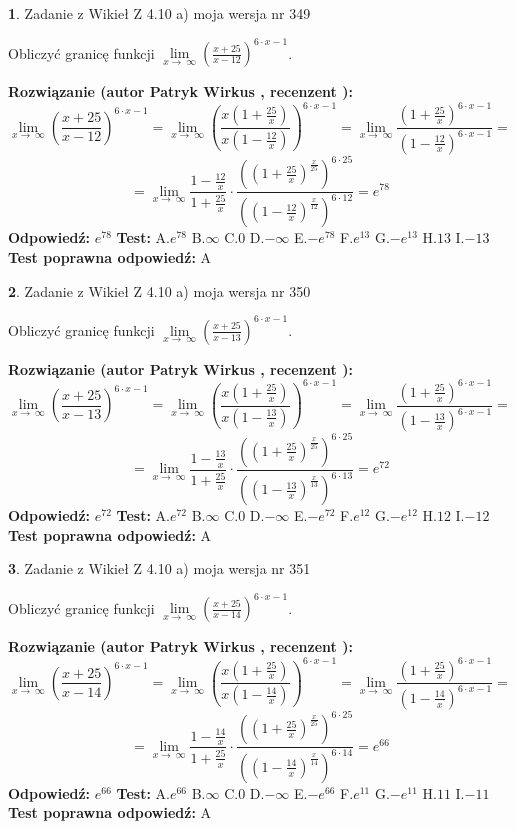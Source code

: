 \documentclass[12pt, a4paper]{article}
\theoremstyle{definition} %
\newtheorem{zad}{}
\newcommand{\zadStart}[1]{\begin{zad}#1\newline}
\newcommand{\zadStop}{\end{zad}}
\newcommand{\rozwStart}[2]{\noindent \textbf{Rozwiązanie (autor #1 , recenzent #2): }\newline}
\newcommand{\rozwStop}{\newline}
\newcommand{\odpStart}{\noindent \textbf{Odpowiedź:}\newline}
\newcommand{\odpStop}{\newline}
\newcommand{\testStart}{\noindent \textbf{Test:}\newline}
\newcommand{\testStop}{\newline}
\newcommand{\kluczStart}{\noindent \textbf{Test poprawna odpowiedź:}\newline}
\newcommand{\kluczStop}{\newline}
\begin{document}
\zadStart{Zadanie z Wikieł Z 4.10 a) moja wersja nr 349}

Obliczyć granicę funkcji  $\lim\limits_{x\to\ \infty}(\frac{x+25}{x-12})^{6\cdot x-1}$.
\zadStop
\rozwStart{Patryk Wirkus}{}
$$\lim\limits_{x\to\ \infty}(\frac{x+25}{x-12})^{6\cdot x-1} = \lim\limits_{x\to\ \infty}(\frac{x(1+\frac{25}{x})}{x(1-\frac{12}{x})})^{6\cdot x-1}=\lim\limits_{x\to\ \infty}\frac{(1+\frac{25}{x})^{6\cdot x-1}}{(1-\frac{12}{x})^{6\cdot x-1}}=$$
$$=\lim\limits_{x\to\ \infty}\frac{1-\frac{12}{x}}{1+\frac{25}{x}}\cdot\frac{((1+\frac{25}{x})^{\frac{x}{25}})^{6\cdot25}}{((1-\frac{12}{x})^{\frac{x}{12}})^{6\cdot12}}=e^{78}$$
\rozwStop
\odpStart
$e^{78}$
\odpStop
\testStart
A.$e^{78}$ B.$\infty$ C.$0$ D.$-\infty$ E.$-e^{78}$
F.$e^{13}$ G.$-e^{13}$
H.$13$
I.$-13$
\testStop
\kluczStart
A
\kluczStop



\zadStart{Zadanie z Wikieł Z 4.10 a) moja wersja nr 350}

Obliczyć granicę funkcji  $\lim\limits_{x\to\ \infty}(\frac{x+25}{x-13})^{6\cdot x-1}$.
\zadStop
\rozwStart{Patryk Wirkus}{}
$$\lim\limits_{x\to\ \infty}(\frac{x+25}{x-13})^{6\cdot x-1} = \lim\limits_{x\to\ \infty}(\frac{x(1+\frac{25}{x})}{x(1-\frac{13}{x})})^{6\cdot x-1}=\lim\limits_{x\to\ \infty}\frac{(1+\frac{25}{x})^{6\cdot x-1}}{(1-\frac{13}{x})^{6\cdot x-1}}=$$
$$=\lim\limits_{x\to\ \infty}\frac{1-\frac{13}{x}}{1+\frac{25}{x}}\cdot\frac{((1+\frac{25}{x})^{\frac{x}{25}})^{6\cdot25}}{((1-\frac{13}{x})^{\frac{x}{13}})^{6\cdot13}}=e^{72}$$
\rozwStop
\odpStart
$e^{72}$
\odpStop
\testStart
A.$e^{72}$ B.$\infty$ C.$0$ D.$-\infty$ E.$-e^{72}$
F.$e^{12}$ G.$-e^{12}$
H.$12$
I.$-12$
\testStop
\kluczStart
A
\kluczStop



\zadStart{Zadanie z Wikieł Z 4.10 a) moja wersja nr 351}

Obliczyć granicę funkcji  $\lim\limits_{x\to\ \infty}(\frac{x+25}{x-14})^{6\cdot x-1}$.
\zadStop
\rozwStart{Patryk Wirkus}{}
$$\lim\limits_{x\to\ \infty}(\frac{x+25}{x-14})^{6\cdot x-1} = \lim\limits_{x\to\ \infty}(\frac{x(1+\frac{25}{x})}{x(1-\frac{14}{x})})^{6\cdot x-1}=\lim\limits_{x\to\ \infty}\frac{(1+\frac{25}{x})^{6\cdot x-1}}{(1-\frac{14}{x})^{6\cdot x-1}}=$$
$$=\lim\limits_{x\to\ \infty}\frac{1-\frac{14}{x}}{1+\frac{25}{x}}\cdot\frac{((1+\frac{25}{x})^{\frac{x}{25}})^{6\cdot25}}{((1-\frac{14}{x})^{\frac{x}{14}})^{6\cdot14}}=e^{66}$$
\rozwStop
\odpStart
$e^{66}$
\odpStop
\testStart
A.$e^{66}$ B.$\infty$ C.$0$ D.$-\infty$ E.$-e^{66}$
F.$e^{11}$ G.$-e^{11}$
H.$11$
I.$-11$
\testStop
\kluczStart
A
\kluczStop
\end{document}
